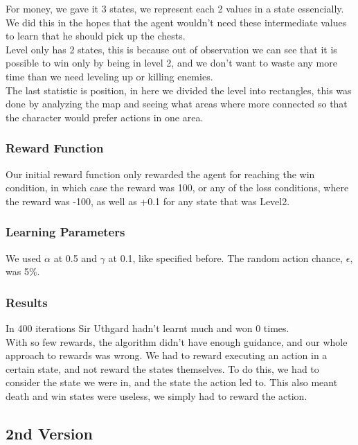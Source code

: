 \documentclass{article}
\begin{document}
  For money, we gave it 3 states, we represent each 2 values in a state essencially. We did this in the hopes that the agent wouldn't need these intermediate values to learn that he should pick up the chests.\\
  Level only has 2 states, this is because out of observation we can see that it is possible to win only by being in level 2, and we don't want
  to waste any more time than we need leveling up or killing enemies.\\
  The last statistic is position, in here we divided the level into rectangles, this was done by analyzing the map and seeing what areas where more
  connected so that the character would prefer actions in one area.\\

  \subsubsection{Reward Function}

  Our initial reward function only rewarded the agent for reaching the win condition, in which case the reward was 100, or any of the loss conditions,
  where the reward was -100, as well as +0.1 for any state that was Level2.\\

  \subsubsection{Learning Parameters}

  We used $\alpha$ at 0.5 and $\gamma$ at 0.1, like specified before. The random action chance, $\epsilon$, was 5\%.\\

  \subsubsection{Results}

  In 400 iterations Sir Uthgard hadn't learnt much and won 0 times.\\
  With so few rewards, the algorithm didn't have enough guidance, and our whole approach to rewards was wrong. 
  We had to reward executing an action in a certain state, and not reward the states themselves. To do this, we had to consider the state we were in, and the state the action led to. 
  This also meant death and win states were useless, we simply had to reward the action.\\

  \subsection{2nd Version}
\end{document}
